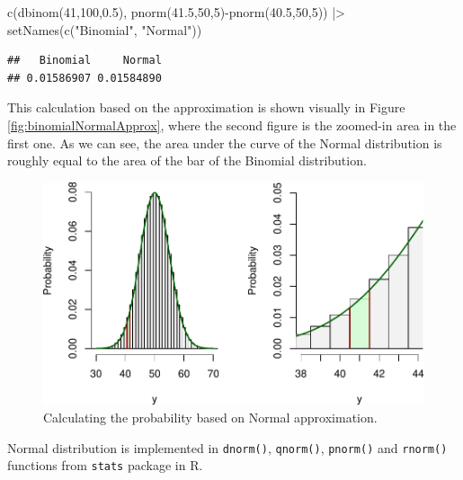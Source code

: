 \documentclass[
]{book}
\newenvironment{Shaded}{\begin{snugshade}}{\end{snugshade}}
\newcommand{\DecValTok}[1]{\textcolor[rgb]{0.00,0.00,0.81}{#1}}
\newcommand{\FloatTok}[1]{\textcolor[rgb]{0.00,0.00,0.81}{#1}}
\newcommand{\FunctionTok}[1]{\textcolor[rgb]{0.00,0.00,0.00}{#1}}
\newcommand{\NormalTok}[1]{#1}
\newcommand{\SpecialCharTok}[1]{\textcolor[rgb]{0.00,0.00,0.00}{#1}}
\newcommand{\StringTok}[1]{\textcolor[rgb]{0.31,0.60,0.02}{#1}}
\theoremstyle{definition}
\theoremstyle{definition}
\theoremstyle{definition}
\theoremstyle{definition}
\theoremstyle{remark}
\begin{document}
\begin{Shaded}
\begin{Highlighting}[]
\FunctionTok{c}\NormalTok{(}\FunctionTok{dbinom}\NormalTok{(}\DecValTok{41}\NormalTok{,}\DecValTok{100}\NormalTok{,}\FloatTok{0.5}\NormalTok{),}
  \FunctionTok{pnorm}\NormalTok{(}\FloatTok{41.5}\NormalTok{,}\DecValTok{50}\NormalTok{,}\DecValTok{5}\NormalTok{)}\SpecialCharTok{{-}}\FunctionTok{pnorm}\NormalTok{(}\FloatTok{40.5}\NormalTok{,}\DecValTok{50}\NormalTok{,}\DecValTok{5}\NormalTok{)) }\SpecialCharTok{|\textgreater{}}
    \FunctionTok{setNames}\NormalTok{(}\FunctionTok{c}\NormalTok{(}\StringTok{"Binomial"}\NormalTok{, }\StringTok{"Normal"}\NormalTok{))}
\end{Highlighting}
\end{Shaded}

\begin{verbatim}
##   Binomial     Normal 
## 0.01586907 0.01584890
\end{verbatim}

This calculation based on the approximation is shown visually in Figure \ref{fig:binomialNormalApprox}, where the second figure is the zoomed-in area in the first one. As we can see, the area under the curve of the Normal distribution is roughly equal to the area of the bar of the Binomial distribution.

\begin{figure}
\centering
\includegraphics{Svetunkov---Statistics-for-Business-Analytics_files/figure-latex/binomialNormalApproxArea-1.pdf}
\caption{\label{fig:binomialNormalApproxArea}Calculating the probability based on Normal approximation.}
\end{figure}

Normal distribution is implemented in \texttt{dnorm()}, \texttt{qnorm()}, \texttt{pnorm()} and \texttt{rnorm()} functions from \texttt{stats} package in R.
\end{document}
